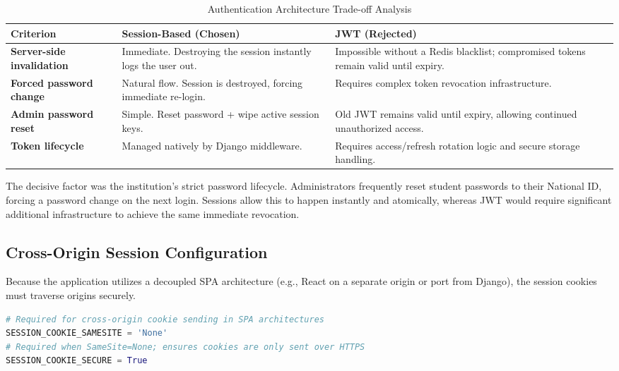 \begin{table}[H]
    \centering
    \renewcommand{\arraystretch}{1.3}
    \begin{tabular}{|p{}|p{}|p{}|}
        \hline
        \textbf{Criterion} & \textbf{Session-Based (Chosen)} & \textbf{JWT (Rejected)} \\
        \hline
        \textbf{Server-side invalidation} & Immediate. Destroying the session instantly logs the user out. & Impossible without a Redis blacklist; compromised tokens remain valid until expiry. \\
        \hline
        \textbf{Forced password change} & Natural flow. Session is destroyed, forcing immediate re-login. & Requires complex token revocation infrastructure. \\
        \hline
        \textbf{Admin password reset} & Simple. Reset password + wipe active session keys. & Old JWT remains valid until expiry, allowing continued unauthorized access. \\
        \hline
        \textbf{Token lifecycle} & Managed natively by Django middleware. & Requires access/refresh rotation logic and secure storage handling. \\
        \hline
    \end{tabular}
    \caption{Authentication Architecture Trade-off Analysis}
    \label{tab:auth_tradeoff}
\end{table}

The decisive factor was the institution's strict password lifecycle. Administrators frequently reset student passwords to their National ID, forcing a password change on the next login. Sessions allow this to happen instantly and atomically, whereas JWT would require significant additional infrastructure to achieve the same immediate revocation.

\subsection{Cross-Origin Session Configuration}

Because the application utilizes a decoupled SPA architecture (e.g., React on a separate origin or port from Django), the session cookies must traverse origins securely.

\begin{lstlisting}[language=Python, caption=Session Cookie Configuration (\texttt{settings.py})]
# Required for cross-origin cookie sending in SPA architectures
SESSION_COOKIE_SAMESITE = 'None'   
# Required when SameSite=None; ensures cookies are only sent over HTTPS
SESSION_COOKIE_SECURE = True       
\end{lstlisting}


